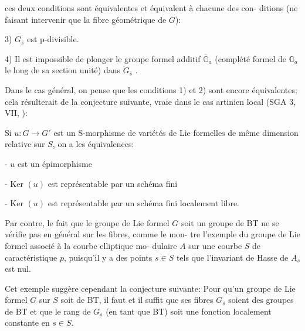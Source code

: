 
ces deux conditions sont équivalentes et équivalent à chacune des con-%
ditions (ne faisant intervenir que la fibre géométrique de $G$):

3) $G_{\bar{s}}$ est p-divisible.

4) Il est impossible de plonger le groupe formel additif $\overline{\mathbb{G}}_a$
(complété formel de $\mathbb{G}_a$ le long de sa section unité) dans $G_{\bar{s}}$ .

Dans le cas général, on pense que les conditions 1) et 2) sont
encore équivalentes; cela résulterait de la conjecture suivante, vraie
dans le cas artinien local (SGA 3, VII, \quad ):

Si $u\colon G \to G'$ est un S-morphisme de variétés de Lie formelles
de même dimension relative sur $S$, on a les équivalences:

- $u$ est un épimorphisme

- Ker $(u)$ est représentable par un schéma fini

- Ker $(u)$ est représentable par un schéma fini localement libre.

Par contre, le fait que le groupe de Lie formel $G$ soit un
groupe de BT ne se vérifie pas en général sur les fibres, comme le mon-%
tre l'exemple du groupe de Lie formel associé à la courbe elliptique mo-%
dulaire $A$ sur une courbe $S$ de caractéristique $p$, puisqu'il y a des
points $s \in S$ tels que l'invariant de Hasse de $A_s$ est nul.

Cet exemple suggère cependant la conjecture suivante: Pour
qu'un groupe de Lie formel $G$ sur $S$ soit de BT, il faut et il suffit
que ses fibres $G_s$ soient des groupes de BT et que le rang de $G_s$
(en tant que BT) soit une fonction localement constante en $s \in S$.

